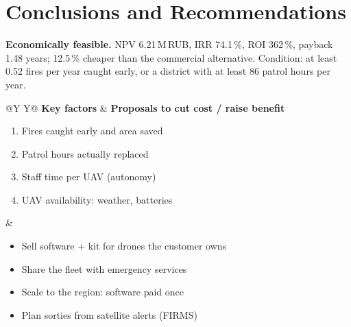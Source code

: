 \documentclass[10pt,a4paper]{article}
\newcommand{\rub}{\,RUB}
\begin{document}
\section{Conclusions and Recommendations}

\begin{takeaway}
\textbf{Economically feasible.} NPV 6.21\,M\rub, IRR 74.1\,\%, ROI 362\,\%, payback 1.48 years; 12.5\,\% cheaper than the commercial
alternative. Condition: at least 0.52 fires per year caught early, or a district with at least 86 patrol hours per year.
\end{takeaway}

\begin{tabularx}{\textwidth}{@{}Y Y@{}}
\textbf{Key factors} & \textbf{Proposals to cut cost / raise benefit} \\
\begin{enumerate}[leftmargin=1.4em]
\item Fires caught early and area saved
\item Patrol hours actually replaced
\item Staff time per UAV (autonomy)
\item UAV availability: weather, batteries
\end{enumerate}
&
\begin{itemize}[leftmargin=1.2em]
\item Sell software + kit for drones the customer owns
\item Share the fleet with emergency services
\item Scale to the region: software paid once
\item Plan sorties from satellite alerts (FIRMS)
\end{itemize} \\
\end{tabularx}

\needspace{5cm}
\end{document}
